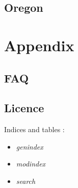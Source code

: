 \documentclass[letterpaper,10pt,english]{sphinxmanual}
\begin{document}
\section{Oregon}
\label{proprietary_protocols:oregon}

\chapter{Appendix}
\label{appendix:appendix}\label{appendix::doc}

\section{FAQ}
\label{appendix:faq}

\section{Licence}
\label{appendix:licence}
Indices and tables :
\begin{itemize}
\item {} 
\emph{genindex}

\item {} 
\emph{modindex}

\item {} 
\emph{search}

\end{itemize}



\renewcommand{\indexname}{Index}
\printindex
\end{document}
